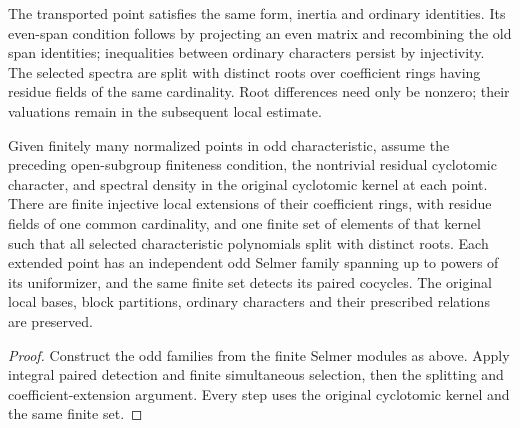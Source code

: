 The transported point satisfies the same form, inertia and ordinary
identities. Its even-span condition follows by projecting an even
matrix and recombining the old span identities; inequalities between
ordinary characters persist by injectivity. The selected spectra
are split with distinct roots over coefficient rings having residue
fields of the same cardinality. Root differences need only be
nonzero; their valuations remain in the subsequent local estimate.

\begin{corollary}
\label{cor:selmer-simultaneous-choice}
Given finitely many normalized points in odd characteristic, assume
the preceding open-subgroup finiteness condition, the nontrivial
residual cyclotomic character, and spectral density in the original
cyclotomic kernel at each point. There are finite injective local
extensions of their coefficient rings, with residue fields of one
common cardinality, and one finite set of elements of that kernel
such that all selected characteristic polynomials split with distinct
roots. Each extended point has an independent odd Selmer family
spanning up to powers of its uniformizer, and the same finite set
detects its paired cocycles. The original local bases, block
partitions, ordinary characters and their prescribed relations are
preserved.
\end{corollary}

\begin{proof}
Construct the odd families from the finite Selmer modules as above.
Apply integral paired detection and finite simultaneous selection,
then the splitting and coefficient-extension argument. Every step
uses the original cyclotomic kernel and the same finite set.
\end{proof}
